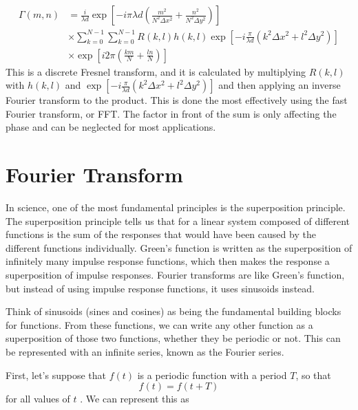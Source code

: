     \begin{equation}
    \begin{aligned}
        \Gamma(m,n) & = \frac{i}{\lambda d}\exp\left[ -i\pi \lambda d\left(
            \frac{m^2}{N^2\Delta x^2}+\frac{n^2}{N^2\Delta y^2}
        \right)\right]\\
        &\times
        \sum_{k=0}^{N-1}\sum_{k=0}^{N-1}R(k,l)h(k,l)\exp\left[ -i
        \frac{\pi}{\lambda d}\left( k^2\Delta x^2+l^2\Delta y^2 \right)
    \right] \\
    &\times \exp\left[ i2\pi\left( \frac{km}{N}+\frac{ln}{N} \right) \right]
    \end{aligned}
    \end{equation}
    This is a discrete Fresnel transform, and it is calculated by multiplying
    $R(k,l)$ with $h(k,l)$ and $\exp\left[ -i
        \frac{\pi}{\lambda d}\left( k^2\Delta x^2+l^2\Delta y^2 \right)
    \right]$
    and then applying an inverse Fourier transform to the product. This is done
    the most effectively using the fast Fourier transform, or FFT\@. The factor
    in front of the sum is only affecting the phase and can be neglected for
    most applications.


        \section{Fourier Transform}

        In science, one of the most fundamental principles is the superposition
        principle. The superposition principle tells us that for a linear system
        composed of different functions is the sum of the responses that would have
        been caused by the different functions individually. Green's function is
        written as the
        superposition of infinitely many impulse response functions, which then makes
        the response a superposition of impulse responses. Fourier transforms are like
        Green's function, but instead of using impulse response functions, it uses
        sinusoids instead.

        Think of sinusoids (sines and cosines) as being the fundamental building blocks
        for functions. From these functions, we can write any other function as a
        superposition of those two functions, whether they be periodic or not. This can
        be represented with an infinite series, known as the Fourier series.

        First, let's suppose that $f(t)$ is a periodic function with a period
        $T$, so that
        \begin{equation}
            f(t)=f(t+T)
        \end{equation}
        for all values of $t$ \cite{DanielSteck}. We can represent this as

